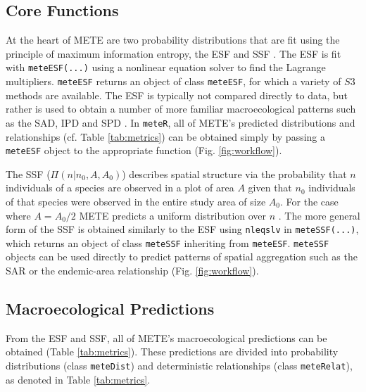 \subsection{Core Functions}

At the heart of METE are two probability distributions that are fit
using the principle of maximum information entropy, the ESF and SSF
\citep{Harte:2011ut}. The ESF is fit with \texttt{meteESF(...)} using
a nonlinear equation solver \citep[package
\texttt{nleqslv};][]{Hasselman2014} to find the Lagrange multipliers.
\texttt{meteESF} returns an object of class \texttt{meteESF}, for which a
variety of $S3$ methods are available. The ESF is typically not
compared directly to data, but rather is used to obtain a number of
more familiar macroecological patterns such as the SAD, IPD and SPD
\citep[Table \ref{tab:metrics};][note that we use power---the ``P'' in
IPD and SPD to refer to metabolic rate]{Harte:2008uf, Harte:2011ut}.
In \texttt{meteR}, all of METE's predicted distributions and
relationships (cf. Table \ref{tab:metrics}) can be obtained simply by
passing a \texttt{meteESF} object to the appropriate function (Fig.
\ref{fig:workflow}).

The SSF ($\Pi(n|n_0, A, A_0)$) describes spatial structure via the
probability that $n$ individuals of a species are observed in a plot
of area $A$ given that $n_0$ individuals of that species were observed
in the entire study area of size $A_0$. For the case where $A=A_{0}/2$
METE predicts a uniform distribution over $n$ \citep[p.
159][]{Harte:2011ut}. The more general form of the SSF is obtained
similarly to the ESF using \texttt{nleqslv} in \texttt{meteSSF(...)},
which returns an object of class \texttt{meteSSF} inheriting from
\texttt{meteESF}. \texttt{meteSSF} objects can be used directly to
predict patterns of spatial aggregation such as the SAR or the
endemic-area relationship (Fig. \ref{fig:workflow}).


\subsection{Macroecological Predictions}

From the ESF and SSF, all of METE's macroecological predictions can be
obtained (Table \ref{tab:metrics}). These predictions are divided into
probability distributions (class \texttt{meteDist}) and deterministic
relationships (class \texttt{meteRelat}), as denoted in Table
\ref{tab:metrics}.

